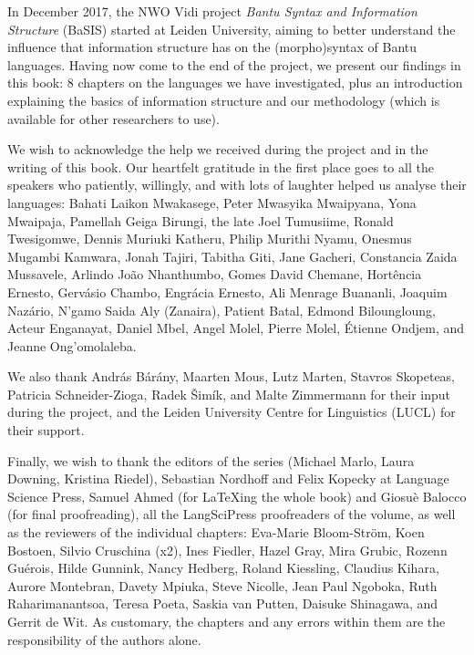 
In December 2017, the NWO Vidi project \textit{Bantu Syntax and Information Structure} (BaSIS) started at Leiden University, aiming to better understand the influence that information structure has on the (morpho)syntax of Bantu languages. Having now come to the end of the project, we present our findings in this book: 8 chapters on the languages we have investigated, plus an introduction explaining the basics of information structure and our methodology (which is available for other researchers to use).

We wish to acknowledge the help we received during the project and in the writing of this book. Our heartfelt gratitude in the first place goes to all the speakers who patiently, willingly, and with lots of laughter helped us analyse their languages: Bahati Laikon Mwakasege, Peter Mwasyika Mwaipyana, Yona Mwaipaja, Pamellah Geiga Birungi, the late Joel Tumusiime, Ronald Twesigomwe, Dennis Muriuki Katheru, Philip Murithi Nyamu, Onesmus Mugambi Kamwara, Jonah Tajiri, Tabitha Giti, Jane Gacheri, Constancia Zaida Mussavele, Arlindo João Nhanthumbo, Gomes David Chemane, Hortência Ernesto, Gervásio Chambo, Engrácia Ernesto, Ali Menrage Buananli, Joaquim Nazário, N'gamo Saida Aly (Zanaira), Patient Batal, Edmond Biloungloung, Acteur Enganayat, Daniel Mbel, Angel Molel, Pierre Molel, Étienne Ondjem, and Jeanne Ong'omolaleba. 

We also thank András Bárány, Maarten Mous, Lutz Marten, Stavros Skopeteas, Patricia Schneider-Zioga, Radek Šimík, and Malte Zimmermann for their input during the project, and the Leiden University Centre for Linguistics (LUCL) for their support. 

Finally, we wish to thank the editors of the series (Michael Marlo, Laura Downing, Kristina Riedel), Sebastian Nordhoff and Felix Kopecky at Language Science Press, Samuel Ahmed (for LaTeXing the whole book) and Giosuè Balocco (for final proofreading), all the LangSciPress proofreaders of the volume, as well as the reviewers of the individual chapters: Eva-Marie Bloom-Ström, Koen Bostoen, Silvio Cruschina (x2), Ines Fiedler, Hazel Gray, Mira Grubic, Rozenn Guérois, Hilde Gunnink, Nancy Hedberg, Roland Kiessling, Claudius Kihara, Aurore Montebran, Davety Mpiuka, Steve Nicolle, Jean Paul Ngoboka, Ruth Raharimanantsoa, Teresa Poeta, Saskia van Putten, Daisuke Shinagawa, and Gerrit de Wit.  As customary, the chapters and any errors within them are the responsibility of the authors alone.

